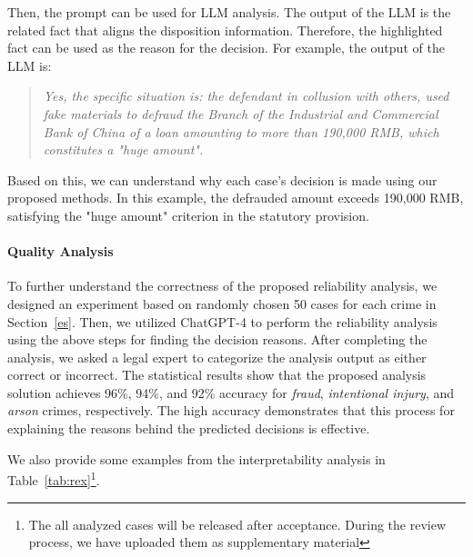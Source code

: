 Then, the prompt can be used for LLM analysis. The output of the LLM is the related fact that aligns the disposition information. Therefore, the highlighted fact can be used as the reason for the decision. For example, the output of the LLM is:
\begin{quote}
    \textit{Yes, the specific situation is: the defendant in collusion with others, used fake materials to defraud the Branch of the Industrial and Commercial Bank of China of a loan amounting to more than 190,000 RMB, which constitutes a "huge amount".}
\end{quote}

Based on this, we can understand why each case's decision is made using our proposed methods. In this example, the defrauded amount exceeds 190,000 RMB, satisfying the "huge amount" criterion in the statutory provision.

\paragraph{Quality Analysis} To further understand the correctness of the proposed reliability analysis, we designed an experiment based on randomly chosen 50 cases for each crime in Section~\ref{es}. Then, we utilized ChatGPT-4 to perform the reliability analysis using the above steps for finding the decision reasons. After completing the analysis, we asked a legal expert to categorize the analysis output as either correct or incorrect. The statistical results show that the proposed analysis solution achieves 96\%, 94\%, and 92\% accuracy for \textit{fraud}, \textit{intentional injury}, and \textit{arson} crimes, respectively. The high accuracy demonstrates that this process for explaining the reasons behind the predicted decisions is effective.

We also provide some examples from the interpretability analysis in Table~\ref{tab:rex}\footnote{The all analyzed cases will be released after acceptance. During the review process, we have uploaded them as supplementary material}.

